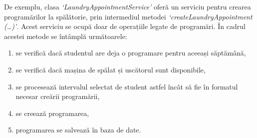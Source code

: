 \documentclass[12pt,a4paper]{report}
\theoremstyle{definition}
\theoremstyle{remark}
\begin{document}
\par De exemplu, clasa \textit{`LaundryAppointmentService'} oferă un serviciu pentru crearea programărilor la spălătorie, prin intermediul metodei \textit{`createLaundryAppointment (\ldots)'}. Acest serviciu se ocupă doar de operațiile legate de programări. În cadrul acestei metode se întâmplă următoarele:

\begin{enumerate}
    \item se verifică dacă studentul are deja o programare pentru aceeași săptămână,
    \item se verifică dacă mașina de spălat și uscătorul sunt disponibile,
    \item se procesează intervalul selectat de student astfel încât să fie în formatul necesar creării programării,
    \item se creează programarea,
    \item programarea se salvează în baza de date.
\end{enumerate}
\end{document}
